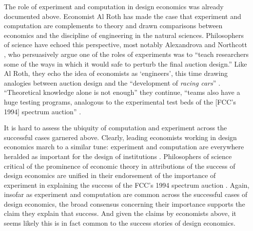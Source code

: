 The role of experiment and computation in design economics was already documented above. Economist Al Roth \autocite*{roth2002, roth2018} has made the case that experiment and computation are complements to theory and drawn comparisons between economics and the discipline of engineering in the natural sciences. Philosophers of science have echoed this perspective, most notably Alexandrova and Northcott \autocite*[320]{alexandrova2009}, who persuasively argue one of the roles of experiments was to ``teach researchers some of the ways in which it would safe to perturb the final auction design.'' Like Al Roth, they echo the idea of economists as `engineers', this time drawing analogies between auction design and the ``development of \textit{racing cars}'' \autocite[331, emphasis original]{alexandrova2009}. ``Theoretical knowledge alone is not enough'' they continue, ``teams also have a huge testing programs, analogous to the experimental test beds of the [FCC's 1994] spectrum auction'' \autocite[331]{alexandrova2009}. 

It is hard to assess the ubiquity of computation and experiment across the successful cases garnered above. Clearly, leading economists working in design economics march to a similar tune: experiment and computation are everywhere heralded as important for the design of institutions \autocite{roth2002,binmore2002,sönmez2023minimalist,milgrom2004}. Philosophers of science critical of the prominence of economic theory in attributions of the success of design economics are unified in their endorsement of the importance of experiment in explaining the success of the FCC's 1994 spectrum auction \autocite{alexandrova2009,nikkhah2008}. Again, insofar as experiment and computation are common across the successful cases of design economics, the broad consensus concerning their importance supports the claim they explain that success. And given the claims by economists above, it seems likely this is in fact common to the success stories of design economics.

